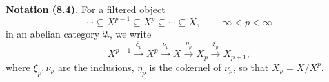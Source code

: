 \textbf{Notation (8.4).} For a filtered object
$$
\cdots \subseteq X^{p-1} \subseteq X^p \subseteq \cdots \subseteq X, \quad -\infty < p < \infty
$$
in an abelian category $\mathfrak{A}$, we write
$$
X^{p-1} \xrightarrow{\xi_p} X^p \xrightarrow{\nu_p} X \xrightarrow{\eta_p} X_p \xrightarrow{\xi_p} X_{p+1},
$$
where $\xi_p, \nu_p$ are the inclusions, $\eta_p$ is the cokernel of $\nu_p$, so that $X_p = X / X^p$.
